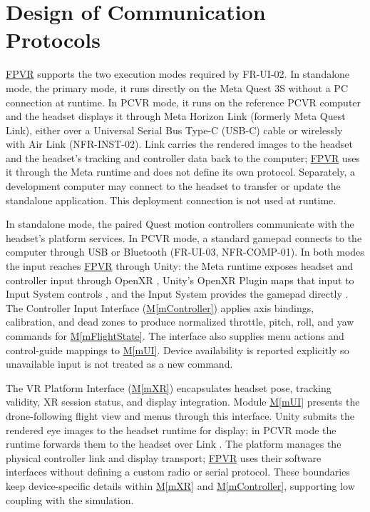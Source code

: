 \documentclass[12pt, titlepage]{article}
\DeclareRobustCommand{\mgabbr}[2]{\hyperlink{mg-abbr:#1}{#2}}
\newcommand{\mref}[1]{\hyperref[#1]{M\ref*{#1}}}
\begin{document}
\section{Design of Communication Protocols}

\mgabbr{fpvr}{FPVR} supports the two execution modes required by FR-UI-02. In
standalone
mode, the primary mode, it runs directly on the Meta Quest 3S without a PC
connection at runtime. In PCVR mode, it runs on the reference PCVR computer
and the headset displays it through Meta Horizon Link (formerly Meta Quest
Link), either over a Universal Serial Bus Type-C (USB-C) cable or wirelessly
with Air Link
\citep{MetaHorizonLink} (NFR-INST-02). Link carries the rendered
images to the headset and the headset's tracking and controller data back
to the computer; \mgabbr{fpvr}{FPVR} uses it through the Meta runtime and does
not define
its own protocol. Separately, a development computer may connect to the
headset to transfer or update the standalone application. This deployment
connection is not used at runtime.

In standalone mode, the paired Quest motion controllers communicate with the
headset's platform services. In PCVR mode, a standard gamepad connects to
the computer through USB or Bluetooth (FR-UI-03, NFR-COMP-01). In both modes
the input reaches \mgabbr{fpvr}{FPVR} through Unity: the Meta runtime exposes
headset and
controller input through OpenXR \citep{KhronosOpenXR}, Unity's OpenXR Plugin
maps that input to Input System controls \citep{UnityOpenXRInput}, and the
Input System provides the gamepad directly \citep{UnityInputSystemGamepad}. The
Controller
Input Interface (\mref{mController}) applies axis bindings, calibration, and
dead zones to produce normalized throttle, pitch, roll, and yaw commands
for \mref{mFlightState}. The interface also supplies menu actions and
control-guide
mappings to \mref{mUI}. Device availability is reported explicitly so
unavailable input is not treated as a new command.

The VR Platform Interface (\mref{mXR}) encapsulates headset pose, tracking
validity, XR session status, and display integration. Module \mref{mUI}
presents the drone-following flight view and menus through this interface.
Unity submits the rendered eye images to the headset runtime for display;
in PCVR mode the runtime forwards them to the headset over Link
\citep{MetaHorizonLink}.
The platform manages the physical controller link and display transport;
\mgabbr{fpvr}{FPVR} uses their software interfaces without defining a custom
radio or
serial protocol. These boundaries keep device-specific details within
\mref{mXR} and \mref{mController}, supporting low coupling with the simulation.
\end{document}
